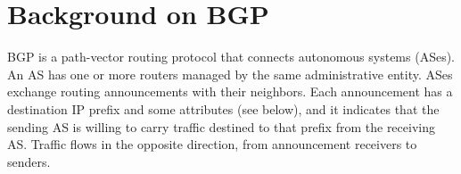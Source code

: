\documentclass[10pt]{sigalternate052015}
\newcommand{\todo}[1]{\textcolor{red}{[TODO: #1]}}
\newcommand{\sysname}{{\small \sf Propane}\xspace}
\begin{document}







%
%
%
%

\section{Background on BGP}
\label{sec:background}


BGP is a path-vector routing protocol that connects autonomous systems (ASes). An AS has one or more routers managed by the same administrative entity. ASes exchange routing announcements with their neighbors. Each announcement has a destination IP prefix and some attributes (see below), and it indicates that the sending AS is willing to carry traffic destined to that prefix from the receiving AS. Traffic flows in the opposite direction, from announcement receivers to senders.
\end{document}
